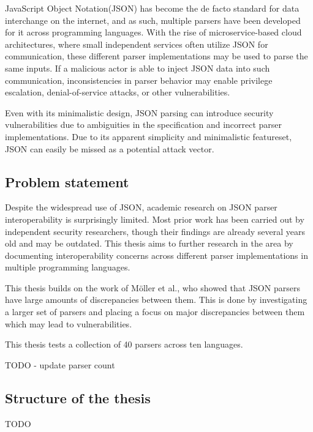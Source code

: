 \documentclass[english, 12pt, a4paper, sci, utf8, a-2b, online]{aaltothesis}
\def\note#1{\begin{flushleft}
	{\color{orange} \raggedright \textsf{#1}}
 \linebreak \noindent
\end{flushleft}}
\begin{document}
JavaScript Object Notation(JSON) has become the de facto standard for data interchange on the internet, and as such, multiple parsers have been developed for it across programming languages. With the rise of microservice-based cloud architectures, where small independent services often utilize JSON for communication, these different parser implementations may be used to parse the same inputs. If a malicious actor is able to inject JSON data into such communication, inconsistencies in parser behavior may enable privilege escalation, denial-of-service attacks, or other vulnerabilities.

Even with its minimalistic design, JSON parsing can introduce security vulnerabilities due to ambiguities in the specification and incorrect parser implementations. Due to its apparent simplicity and minimalistic featureset, JSON can easily be missed as a potential attack vector.


\subsection{Problem statement}
Despite the widespread use of JSON, academic research on JSON parser interoperability is surprisingly limited. Most prior work has been carried out by independent security researchers, though their findings are already several years old and may be outdated. This thesis aims to further research in the area by documenting interoperability concerns across different parser implementations in multiple programming languages.

This thesis builds on the work of Möller et al., who showed that JSON parsers have large amounts of discrepancies between them. This is done by investigating a larger set of parsers and placing a focus on major discrepancies between them which may lead to vulnerabilities.

This thesis tests a collection of 40 parsers across ten languages.

\note{TODO - update parser count}


\subsection{Structure of the thesis}
\note{TODO}

\thispagestyle{empty}
\end{document}
